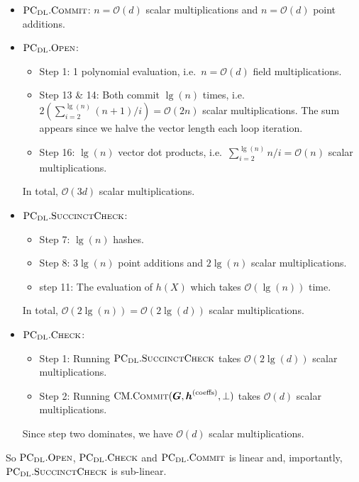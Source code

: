 \documentclass[
]{article}
\providecommand{\tightlist}{%
  \setlength{\itemsep}{0pt}\setlength{\parskip}{0pt}}
\newcommand*\Oc{\mathcal{O}}
\renewcommand{\vec}[1]{ \boldsymbol{#1} }
\newcommand*{\Commit}{\mathrm{\text{C{\scriptsize OMMIT}}}}
\newcommand*{\PCDL}{\text{PC}_{\text{DL}}}
\newcommand*{\PCDLCommit}{\PCDL.\Commit}
\newcommand*{\PCDLOpen}{\PCDL.\mathrm{\text{O\scriptsize PEN}}}
\newcommand*{\PCDLSuccinctCheck}{\PCDL.\mathrm{\text{S{\scriptsize UCCINCT}C{\scriptsize HECK}}}}
\newcommand*{\PCDLCheck}{\PCDL.\mathrm{\text{C\scriptsize HECK}}}
\newcommand*{\CM}{\mathrm{\text{CM}}}
\newcommand*{\CMCommit}{\CM.\Commit}
\begin{document}
\begin{itemize}
\tightlist
\item
  \(\PCDLCommit\): \(n = \Oc(d)\) scalar multiplications and
  \(n = \Oc(d)\) point additions.
\item
  \(\PCDLOpen\):

  \begin{itemize}
  \tightlist
  \item
    Step 1: 1 polynomial evaluation, i.e.~\(n = \Oc(d)\) field
    multiplications.
  \item
    Step 13 \& 14: Both commit \(\lg(n)\) times,
    i.e.~\(2 (\sum_{i=2}^{\lg(n)} (n+1)/i) = \Oc(2n)\) scalar
    multiplications. The sum appears since we halve the vector length
    each loop iteration.
  \item
    Step 16: \(\lg(n)\) vector dot products,
    i.e.~\(\sum_{i=2}^{\lg(n)} n/i = \Oc(n)\) scalar multiplications.
  \end{itemize}

  In total, \(\Oc(3d)\) scalar multiplications.
\item
  \(\PCDLSuccinctCheck\):

  \begin{itemize}
  \tightlist
  \item
    Step 7: \(\lg(n)\) hashes.
  \item
    Step 8: \(3 \lg(n)\) point additions and \(2 \lg(n)\) scalar
    multiplications.
  \item
    step 11: The evaluation of \(h(X)\) which takes \(\Oc(\lg(n))\)
    time.
  \end{itemize}

  In total, \(\Oc(2 \lg(n)) = \Oc(2 \lg(d))\) scalar multiplications.
\item
  \(\PCDLCheck\):

  \begin{itemize}
  \tightlist
  \item
    Step 1: Running \(\PCDLSuccinctCheck\) takes \(\Oc(2 \lg(d))\)
    scalar multiplications.
  \item
    Step 2: Running
    \(\CMCommit(\vec{G}, \vec{h}^{\text{(coeffs)}}, \bot)\) takes
    \(\Oc(d)\) scalar multiplications.
  \end{itemize}

  Since step two dominates, we have \(\Oc(d)\) scalar multiplications.
\end{itemize}

So \(\PCDLOpen\), \(\PCDLCheck\) and \(\PCDLCommit\) is linear and,
importantly, \(\PCDLSuccinctCheck\) is sub-linear.
\end{document}
